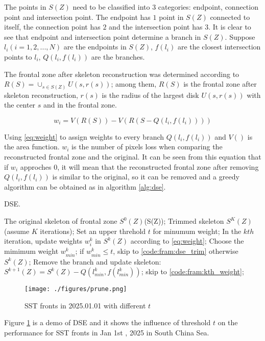 The points in $S(Z)$ need to be classified into $3$ categories: endpoint, connection point and intersection point. The endpoint has $1$ point in $S(Z)$ connected to itself, the connection point has $2$ and the intersection point has $3$. It is clear to see that endpoint and intersection point determine a branch in $S(Z)$. Suppose $l_i(i=1,2,...,N)$ are the endpoints in $S(Z)$, $f(l_i)$ are the closest intersection points to $l_i$, $Q(l_i,f(l_i))$ are the branches.

The frontal zone after skeleton reconstruction was determined according to $R(S)=\cup_{s\in S(Z)}U(s,r(s))$; among them, $R(S)$ is the frontal zone after skeleton reconstruction, $r(s)$ is the radius of the largest disk $U(s,r(s))$ with the center $s$ and in the frontal zone.

\begin{equation}\label{eq:weight}
	w_i=V(R(S))-V(R(S-Q(l_i,f(l_i))))
\end{equation}

Using \eqref{eq:weight} to assign weights to every branch $Q(l_i,f(l_i))$ and $V()$ is the area function. $w_i$ is the number of pixels loss when comparing the reconstructed frontal zone and the original. It can be seen from this equation that if $w_i$ approches $0$, it will mean that the reconstructed frontal zone after removing $Q(l_i,f(l_i))$ is similar to the original, so it can be removed and a greedy algorithm can be obtained as in algorithm \ref{alg:dse}.

\begin{algorithm}
	\caption{DSE.}
	\label{alg:dse}
	\begin{algorithmic}[1]
		\Require
		The original skeleton of frontal zone $S^0(Z)$(S(Z));
		\Ensure
		Trimmed skeleton $S^{K}(Z)$(assume $K$ iterations);
		\State Set an upper threhold $t$ for minumum weight;
		\label{code:fram:threshold}
		\State In the $kth$ iteration, update weights $w^k_i$ in $S^k(Z)$ according to  \eqref{eq:weight};
		\label{code:fram:kth_weight}
		\State Choose the mimimum weight $w^k_{min}$; 
		if $w^k_{min} \leq t$, skip to \ref{code:fram:dse_trim} otherwise \Return $S^{k}(Z)$;
		\label{code:fram:dse_judge}
		\State Remove the branch and update skeleton: $S^{k+1}(Z)=S^k(Z)-Q(l_{min}^k,f(l_{min}^k))$;
		skip to \ref{code:fram:kth_weight};
		\label{code:fram:dse_trim}
	\end{algorithmic}
\end{algorithm}

\begin{figure}
	\centering
	\texttt{[image: ./figures/prune.png]}
	\caption{SST fronts in 2025.01.01 with different $t$} 
	\label{fig:dse} 
\end{figure}

Figure \ref{fig:dse} is a demo of DSE and it shows the influence of threshold $t$ on the performance for SST fronts in Jan 1st , 2025 in South China Sea.